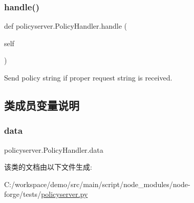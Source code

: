 \subsubsection{\texorpdfstring{handle()}{handle()}}
{\footnotesize\ttfamily def policyserver.\+Policy\+Handler.\+handle (\begin{DoxyParamCaption}\item[{}]{self }\end{DoxyParamCaption})}

\begin{DoxyVerb}Send policy string if proper request string is received.\end{DoxyVerb}
 

\subsection{类成员变量说明}
\mbox{\label{classpolicyserver_1_1_policy_handler_a764fe2f4310a00dd2a7b09e271926dfe}} 
\subsubsection{\texorpdfstring{data}{data}}
{\footnotesize\ttfamily policyserver.\+Policy\+Handler.\+data}



该类的文档由以下文件生成\+:\begin{DoxyCompactItemize}
\item 
C\+:/workspace/demo/src/main/script/node\+\_\+modules/node-\/forge/tests/\mbox{\hyperlink{policyserver_8py}{policyserver.\+py}}\end{DoxyCompactItemize}

